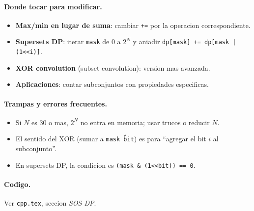 \paragraph{Donde tocar para modificar.}
\begin{itemize}\setlength\itemsep{0pt}
	\item \textbf{Max/min en lugar de suma}: cambiar \texttt{+=} por la operacion correspondiente.
	\item \textbf{Supersets DP}: iterar \texttt{mask} de $0$ a $2^N$ y aniadir \texttt{dp[mask] += dp[mask | (1<<i)]}.
	\item \textbf{XOR convolution} (subset convolution): version mas avanzada.
	\item \textbf{Aplicaciones}: contar subconjuntos con propiedades especificas.
\end{itemize}

\paragraph{Trampas y errores frecuentes.}
\begin{itemize}\setlength\itemsep{0pt}
	\item Si $N$ es 30 o mas, $2^N$ no entra en memoria; usar trucos o reducir $N$.
	\item El sentido del XOR (sumar a \texttt{mask \^ bit}) es para ``agregar el bit $i$ al subconjunto''.
	\item En supersets DP, la condicion es \texttt{(mask \& (1<<bit)) == 0}.
\end{itemize}

\paragraph{Codigo.}
Ver \texttt{cpp.tex}, seccion \textit{SOS DP}.

\vspace{0.5em}
